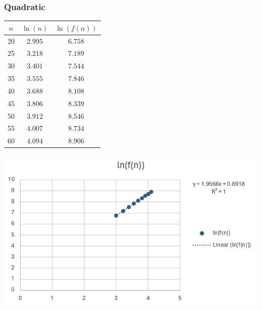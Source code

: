 \documentclass{article}
\begin{document}
    \subsubsection{Quadratic}


\noindent
\begin{minipage}{0.3\textwidth} %
    \centering

    
    
    \begin{tabular}{c|c|c}
        $n$ & $\ln(n)$ & $\ln(f(n))$ \\ \hline
        20 & $2.995$ & $6.758$ \\\hline
        25 & $3.218$ & $7.189$  \\\hline
        30 & $3.401$ & $7.544$\\\hline
        35 & $3.555$ & $7.846$\\\hline
        40 & $3.688$ & $8.108$\\ \hline
        45 & $3.806$ & $8.339$\\ \hline
        50 & $3.912$ & $8.546$\\ \hline
        55 & $4.007$ & $8.734$\\ \hline
        60 & $4.094$ & $8.906$\\
    \end{tabular}

    
    
\end{minipage}%
\begin{minipage}{0.6\textwidth} %

    

    \centering
    \includegraphics[width=1\linewidth]{Graphs/2n^2+3n+1.png} %

     
    
\end{minipage}\noindent
\end{document}
